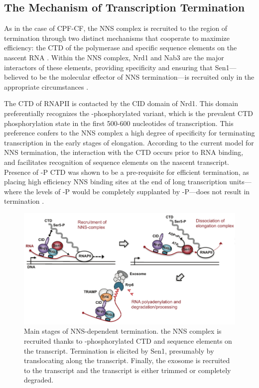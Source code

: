 \subsection{The Mechanism of Transcription Termination}

As in the case of CPF-CF, the NNS complex is recruited to the region of termination through two distinct mechanisms that cooperate to maximize efficiency: the CTD of the polymerase \cite{vasiljeva:2008:nrd1nab3sen1} and specific sequence elements on the nascent RNA \cite{conrad:2000:yeast}. 
Within the NNS complex, Nrd1 and Nab3 are the major interactors of these elements, providing specificity and ensuring that Sen1---believed to be the molecular effector of NNS termination---is recruited only in the appropriate circumstances \cite{porrua:2013:bacteriallike}.

The CTD of RNAPII is contacted by the CID domain of Nrd1. 
This domain preferentially recognizes the \serf{}-phosphorylated variant, which is the prevalent CTD phosphorylation state in the first 500-600 nucleotides of transcription. 
This preference confers to the NNS complex a high degree of specificity for terminating transcription in the early stages of elongation. 
According to the current model for NNS termination, the interaction with the CTD occurs prior to RNA binding, and facilitates recognition of sequence elements on the nascent transcript.  
Presence of \serf{}-P CTD was shown to be a pre-requisite for efficient termination, as placing high efficiency NNS binding sites at the end of long transcription units---where the levels of \serf{}-P would be completely supplanted by \sert{}-P---does not result in termination \cite{gudipati:2008:phosphorylation}.

\begin{figure}[ht]

\centering
\includegraphics[width=\textwidth]{figures/introduction/nns}
\caption[Mechanism of NNS termination]{Main stages of NNS-dependent termination. the NNS complex is recruited thanks to \serf{}-phosphorylated CTD and sequence elements on the transcript. Termination is elicited by Sen1, presumably by translocating along the transcript. Finally, the exosome is recruited to the transcript and the transcript is either trimmed or completely degraded.}
\label{fig:nnsTermination}

\end{figure}

